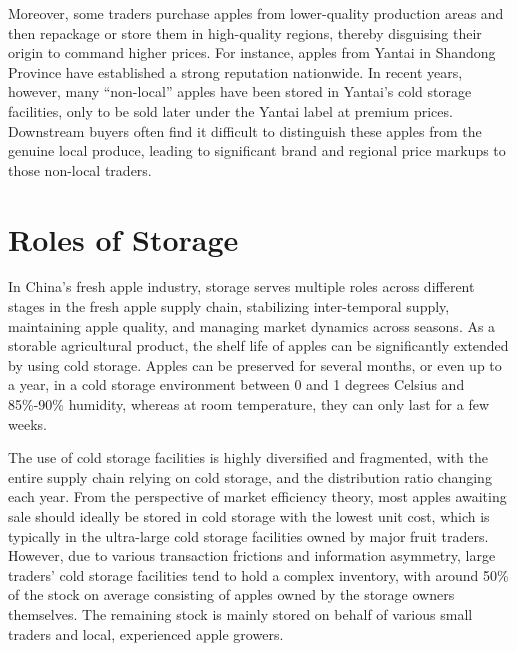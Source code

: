 Moreover, some traders purchase apples from lower-quality production areas and then repackage or store them in high-quality regions, thereby disguising their origin to command higher prices. For instance, apples from Yantai in Shandong Province have established a strong reputation nationwide. In recent years, however, many ``non-local'' apples have been stored in Yantai's cold storage facilities, only to be sold later under the Yantai label at premium prices. Downstream buyers often find it difficult to distinguish these apples from the genuine local produce, leading to significant brand and regional price markups to those non-local traders.


\section{Roles of Storage \label{Section: role of Storage}}
\noindent In China's fresh apple industry, storage serves multiple roles across different stages in the fresh apple supply chain, stabilizing inter-temporal supply, maintaining apple quality, and managing market dynamics across seasons. As a storable agricultural product, the shelf life of apples can be significantly extended by using cold storage. Apples can be preserved for several months, or even up to a year, in a cold storage environment between 0 and 1 degrees Celsius and 85\%-90\% humidity, whereas at room temperature, they can only last for a few weeks.

The use of cold storage facilities is highly diversified and fragmented, with the entire supply chain relying on cold storage, and the distribution ratio changing each year. From the perspective of market efficiency theory, most apples awaiting sale should ideally be stored in cold storage with the lowest unit cost, which is typically in the ultra-large cold storage facilities owned by major fruit traders. However, due to various transaction frictions and information asymmetry, large traders' cold storage facilities tend to hold a complex inventory, with around 50\% of the stock on average consisting of apples owned by the storage owners themselves. The remaining stock is mainly stored on behalf of various small traders and local, experienced apple growers.

